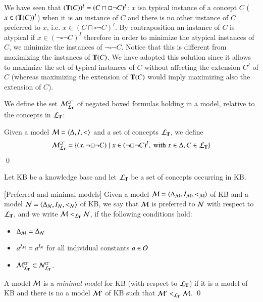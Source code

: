 \documentclass[a4paper, 11pt, oneside]{elsarticle}
\newcommand{\tip}{{\bf T}}
\newcommand{\nott} {\lnot}
\newcommand{\tc} {\mid}
\newcommand{\bbox}{\square}
\newcommand{\sx} {\langle}
\newcommand{\dx} {\rangle}
\newcommand{\ellet} {\mathcal{L}_{\bf T}}
\newcommand{\emme} {\begin{mathcal}M\end{mathcal}}
\newcommand{\enne} {\begin{mathcal}N\end{mathcal}}
\newenvironment{definition}
{\begin{defi} \rm}{\qed \end{defi}}
\newcounter{posu}
\newtheorem{definition}[posu]{Definition}
\begin{document}
We have seen that $(\tip(C))^I =(C \sqcap \bbox \neg C)^I$: $x$ isa typical instance  of a concept $C$ ($x \in (\tip(C))^I$) when it is an instance of $C$  and there is no other instance of $C$ preferred to $x$, i.e. $x \in (C \sqcap \bbox \neg C)^I$.
By contraposition an instance of $C$ is atypical if $x \in (\neg \bbox \neg C)^I$ therefore in order to minimize the atypical instances of $C$, we minimize the instances of $\neg \bbox \neg C$.
Notice that this is different from maximizing the instances of $\tip(C)$.
We have adopted this solution since it allows to maximize the set of typical instances of $C$ without affecting the extension $C^I$ of $C$ (whereas maximizing the extension of $\tip(C)$  would imply maximizing also the extension of $C$).

We define the set $\emme^{\bbox^-}_{\ellet}$ of negated boxed formulas holding in a model, relative to the concepts in $\ellet$:

\begin{definition}
Given a model $\emme=\sx \Delta, I, <\dx$ and a set of concepts $\ellet$, we define $$\emme^{\bbox^-}_{\ellet}=\{(x, \nott \bbox \nott C) \tc x \in (\nott \bbox \nott C)^I, \ \mbox{with} \ x \in \Delta, C \in \ellet \}$$
\end{definition}


\noindent Let KB be a knowledge base and let ${\ellet}$ be a set of concepts occurring in KB.

\begin{definition}[Preferred and minimal models]\label{def preferred and minimal models}
Given a model $\emme=\sx \Delta_{\emme}, I_{\emme}, <_{\emme} \dx$ of KB and  a model $\enne=\sx \Delta_{\enne}, I_{\enne}, <_{\enne} \dx$ of KB, we say that $\emme$ is preferred to $\enne$ with respect to ${\ellet}$, and we write $\emme <_{\ellet} \enne$, if the following conditions hold:

\begin{itemize}
\item $\Delta_{\emme}=\Delta_{\enne}$
\item $a^{I_{\emme}}=a^{I_{\enne}}$ for all individual constants $a \in \begin{mathcal}O\end{mathcal}$
\item $\emme^{\bbox^-}_{\ellet} \subset \enne^{\bbox^-}_{\ellet}$.
\end{itemize}

\noindent A model $\emme$ is a \emph{minimal model} for KB (with respect to ${\ellet}$) if it is a model of KB and there is no a model $\emme'$ of KB such that $\emme' <_{\ellet} \emme$.
\end{definition}
\end{document}
